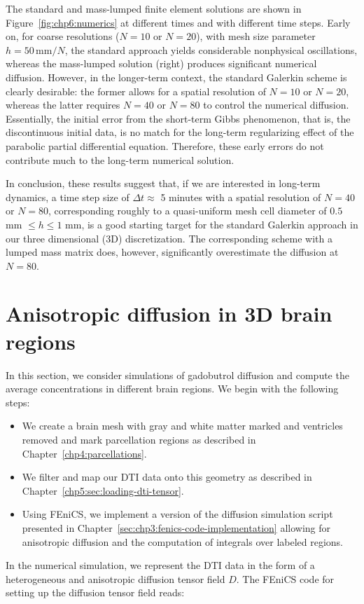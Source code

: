 The standard and mass-lumped finite element solutions are shown in
Figure~\ref{fig:chp6:numerics} at different times and with different
time steps. Early on, for coarse resolutions ($N = 10$ or $N=20$),
with mesh size parameter $h=50 \, \mbox{mm}/N$, the standard approach
yields considerable nonphysical oscillations, whereas the mass-lumped
solution (right) produces significant numerical diffusion. However, in
the longer-term context, the standard Galerkin scheme is clearly
desirable: the former allows for a spatial resolution of $N=10$ or
$N=20$, whereas the latter requires $N=40$ or $N=80$ to control the
numerical diffusion. Essentially, the initial error from the
short-term Gibbs phenomenon, that is, the discontinuous initial data,
is no match for the long-term regularizing effect of the parabolic
partial differential equation. Therefore, these early errors do not
contribute much to the long-term numerical solution.

In conclusion, these results suggest that, if we are interested in
long-term dynamics, a time step size of $\Delta t \approx$ 5 minutes
with a spatial resolution of $N=40$ or $N=80$, corresponding roughly
to a quasi-uniform mesh cell diameter of $0.5$ mm $\leq h \leq 1$ mm,
is a good starting target for the standard Galerkin approach in our
three dimensional (3D) discretization. The corresponding scheme with a
lumped mass matrix does, however, significantly overestimate the
diffusion at $N=80$.

\section{Anisotropic diffusion in 3D brain regions}

In this section, we consider simulations of gadobutrol diffusion and
compute the average concentrations in different brain regions. We
begin with the following steps:
\begin{itemize}
\item
  We create a brain mesh with gray and white matter marked and
  ventricles removed and mark parcellation regions as described in
  Chapter~\ref{chp4:parcellations}. 
\item
  We filter and map our DTI data onto this geometry as described in 
  Chapter~\ref{chp5:sec:loading-dti-tensor}.
\item
  Using FEniCS, we implement a version of the diffusion simulation
  script presented in
  Chapter~\ref{sec:chp3:fenics-code-implementation} allowing for
  anisotropic diffusion and the computation of integrals over labeled
  regions.
\end{itemize}
In the numerical simulation, we represent the DTI data in the form of
a heterogeneous and anisotropic diffusion tensor field $D$. The FEniCS
code for setting up the diffusion tensor field reads:

